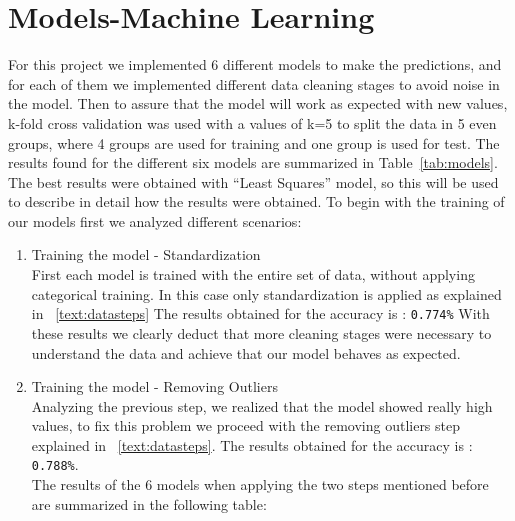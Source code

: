 \documentclass[10pt,conference,compsocconf]{IEEEtran}
\begin{document}
\section{Models-Machine Learning}
For this project we implemented 6 different models to make the predictions, 
and for each of them we implemented different data cleaning stages
to avoid noise in the model. Then to assure that the model will work as 
expected with new values, k-fold cross validation was used with a values of
k=5 to split the data in 5 even groups, where 4 groups are used for training 
and one group is used for test. 
The results found for the different six models are summarized in Table~\ref{tab:models}.
The best results were obtained with ``Least Squares'' model, so this will
be used to describe in detail how the results were obtained.
To begin with the training of our models first we analyzed different scenarios: 

\begin{enumerate}
\item Training the model - Standardization \\
First each model is trained with the entire set of data, without applying categorical 
training. In this case only standardization is applied as explained in ~\ref{text:datasteps}
The results obtained for the accuracy is :  \texttt{0.774\%}
With these results we clearly deduct that more cleaning stages were necessary to understand
the data and achieve that our model behaves as expected.
\item Training the model - Removing Outliers \\
Analyzing the previous step, we realized that the model showed really high values, to fix
this problem we proceed with the removing outliers step explained in ~\ref{text:datasteps}.
The results obtained for the accuracy is :  \texttt{0.788\%}.\\
The results of the 6 models when applying the two steps mentioned before are summarized in 
the following table:
\end{enumerate}
\end{document}
